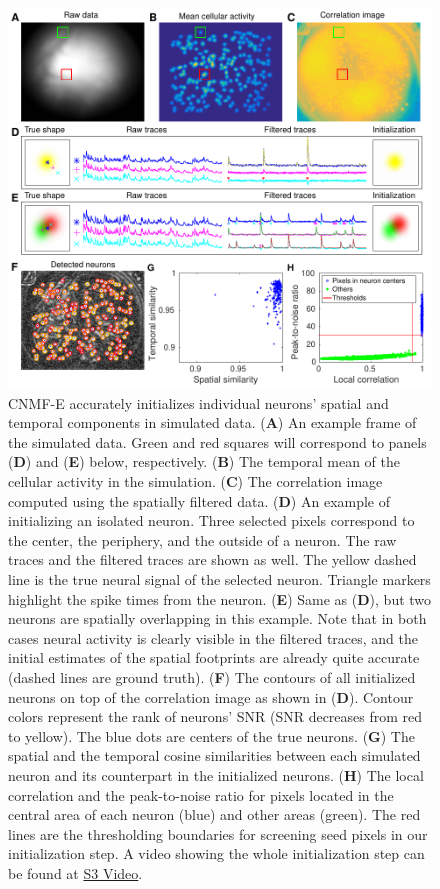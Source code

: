 \documentclass[9pt,lineno]{elife}
\begin{document}
\begin{figure}[!t]
  \includegraphics[width=1\textwidth]{Fig_INIT.pdf}
  \caption{CNMF-E accurately initializes individual neurons' spatial and temporal components in simulated data. (\textbf{A}) An example frame of the simulated data. Green and red squares will correspond to panels (\textbf{D}) and (\textbf{E}) below, respectively. (\textbf{B}) The temporal mean of the cellular activity in the simulation. (\textbf{C}) The correlation image computed using the spatially filtered data. (\textbf{D}) An example of initializing an isolated neuron. Three selected pixels correspond to the center, the periphery, and the outside of a neuron. The raw traces and the filtered traces are shown as well. The yellow dashed line is the true neural signal of the selected neuron. Triangle markers highlight the spike times from the neuron. (\textbf{E}) Same as (\textbf{D}), but two neurons are spatially overlapping in this example.  Note that in both cases neural activity is clearly visible in the filtered traces, and the initial estimates of the spatial footprints are already quite accurate (dashed lines are ground truth). (\textbf{F}) The contours of all initialized neurons on top of the correlation image as shown in (\textbf{D}). Contour colors represent the rank of neurons' SNR (SNR decreases from red to yellow). The blue dots are centers of the true neurons.  (\textbf{G}) The spatial and the temporal cosine similarities between each simulated neuron and its counterpart in the initialized neurons. (\textbf{H}) The local correlation and the peak-to-noise ratio for pixels located in the central area of each neuron (blue) and other areas (green). The red lines are the thresholding boundaries for screening seed pixels in our initialization step. A video showing the whole initialization step can be found at  \href{http://www.columbia.edu/~pz2230/videos/sim_initialization.mp4}{S3 Video}.}
  \label{fig:fig_init}
\end{figure}
\end{document}
